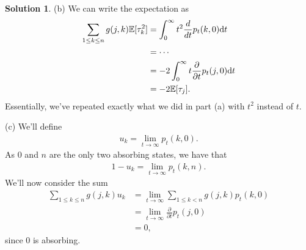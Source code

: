 \documentclass[12pt]{article}
\newcommand{\Expect}{\mathbb{E}}
\theoremstyle{definition}
\newtheorem{sol}{Solution}
\theoremstyle{remark}
\def\d{{\rm d}}
\begin{document}
\begin{sol}
    (b) We can write the expectation as 
    \begin{align*}
        \sum_{1\leq k \leq n} g(j,k) \Expect[ \tau_{k}^{2} ] &= \int_{0}^{\infty} t^{2} \frac{d}{dt} p_{t}(k,0) \d t\\
                                &= \cdots\\
                                &=- 2\int_{0}^{\infty} t\frac{\partial }{\partial t} p_{t}(j, 0) \d t \\
                                &= - 2\Expect[ \tau_{j} ].
    \end{align*}
    Essentially, we've repeated exactly what we did in part (a) with $t^{2}$ instead of $t$. 


    (c) We'll define
    \begin{align*}
        u_{k} = \lim_{t\to \infty} p_{t}(k,0).
    \end{align*}
    As $0$ and $n$ are the only two absorbing states, we have that 
    \begin{align*}
        1 - u_{k} = \lim_{t \to \infty} p_{t}(k, n).
    \end{align*}
    We'll now consider the sum 
    \begin{align*}
        \sum_{1\leq k \leq n} g(j,k) u_{k} &= \lim_{t \to \infty} \sum_{1\leq k < n} g(j,k)p_{t}(k, 0)\\
                                           &= \lim_{t \to \infty} \frac{\partial }{\partial t} p_{t}(j, 0)\\
                                           &= 0,
    \end{align*}
    since $0$ is absorbing.
\end{sol}

\newpage
\end{document}
